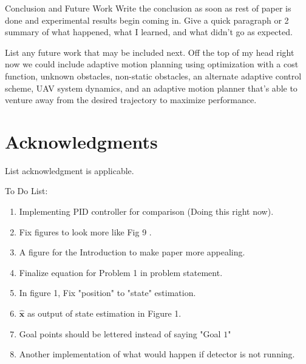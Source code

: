 
\begin{section}{Conclusion and Future Work} \label{sec:conclusion}
Write the conclusion as soon as rest of paper is done and experimental results begin coming in. Give a quick paragraph or 2 summary of what happened, what I learned, and what didn't go as expected.

List any future work that may be included next. Off the top of my head right now we could include adaptive motion planning using optimization with a cost function, unknown obstacles, non-static obstacles, an alternate adaptive control scheme, UAV system dynamics, and an adaptive motion planner that's able to venture away from the desired trajectory to maximize performance.

\end{section}

\section*{Acknowledgments} 
List acknowledgment is applicable.


To Do List:

	\begin{enumerate}[leftmargin=1\parindent]
	\item Implementing PID controller for comparison (Doing this right now).
	\item Fix figures to look more like Fig 9 .
	\item A figure for the Introduction to make paper more appealing.
	\item Finalize equation for Problem 1 in problem statement.
	\item In figure 1, Fix "position" to "state" estimation.
	\item $\hat{\bm{x}}$ as output of state estimation in Figure 1.
	\item Goal points should be lettered instead of saying "Goal $1$"
	\item Another implementation of what would happen if detector is not running.
	
	\end{enumerate}
	

